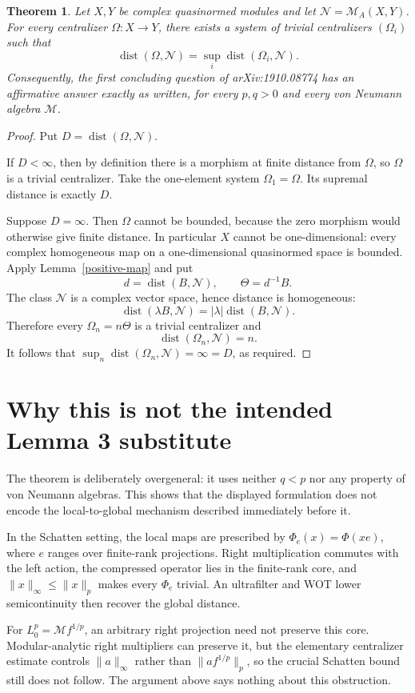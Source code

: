 \documentclass[11pt]{article}
\newtheorem{theorem}{Theorem}
\newcommand{\dist}{\operatorname{dist}}
\newcommand{\M}{\mathcal M}
\newcommand{\N}{\mathscr N}
\begin{document}
\begin{theorem}\label{main}
Let $X,Y$ be complex quasinormed modules and let
$\N=\mathscr{M}_A(X,Y)$.  For every centralizer $\Omega:X\to Y$, there exists
a system of trivial centralizers $(\Omega_i)$ such that
\[
 \dist(\Omega,\N)=\sup_i\dist(\Omega_i,\N).
\]
Consequently, the first concluding question of arXiv:1910.08774 has an
affirmative answer exactly as written, for every $p,q>0$ and every von
Neumann algebra $\M$.
\end{theorem}

\begin{proof}
Put $D=\dist(\Omega,\N)$.

If $D<\infty$, then by definition there is a morphism at finite distance from
$\Omega$, so $\Omega$ is a trivial centralizer.  Take the one-element system
$\Omega_1=\Omega$.  Its supremal distance is exactly $D$.

Suppose $D=\infty$.  Then $\Omega$ cannot be bounded, because the zero
morphism would otherwise give finite distance.  In particular $X$ cannot be
one-dimensional: every complex homogeneous map on a one-dimensional
quasinormed space is bounded.  Apply Lemma~\ref{positive-map} and put
\[
 d=\dist(B,\N),\qquad \Theta=d^{-1}B.
\]
The class $\N$ is a complex vector space, hence distance is homogeneous:
\[
 \dist(\lambda B,\N)=|\lambda|\dist(B,\N).
\]
Therefore every $\Omega_n=n\Theta$ is a trivial centralizer and
\[
 \dist(\Omega_n,\N)=n.
\]
It follows that
$\sup_n\dist(\Omega_n,\N)=\infty=D$, as required.
\end{proof}

\section{Why this is not the intended Lemma 3 substitute}

The theorem is deliberately overgeneral: it uses neither $q<p$ nor any
property of von Neumann algebras.  This shows that the displayed formulation
does not encode the local-to-global mechanism described immediately before
it.

In the Schatten setting, the local maps are prescribed by
$\Phi_e(x)=\Phi(xe)$, where $e$ ranges over finite-rank projections.  Right
multiplication commutes with the left action, the compressed operator lies in
the finite-rank core, and $\|x\|_\infty\leq\|x\|_p$ makes every $\Phi_e$
trivial.  An ultrafilter and WOT lower semicontinuity then recover the global
distance.

For $L^p_0=\M f^{1/p}$, an arbitrary right projection need not preserve this
core.  Modular-analytic right multipliers can preserve it, but the elementary
centralizer estimate controls $\|a\|_\infty$ rather than
$\|af^{1/p}\|_p$, so the crucial Schatten bound still does not follow.  The
argument above says nothing about this obstruction.
\end{document}
